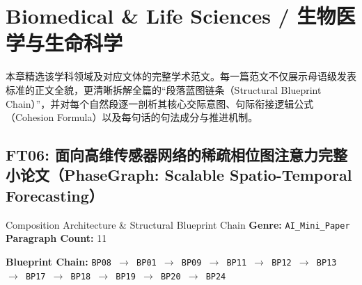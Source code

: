 \chapter{Biomedical \& Life Sciences / 生物医学与生命科学}\label{ch:anthology_19}
本章精选该学科领域及对应文体的完整学术范文。每一篇范文不仅展示母语级发表标准的正文全貌，更清晰拆解全篇的“段落蓝图链条（Structural Blueprint Chain）”，并对每个自然段逐一剖析其核心交际意图、句际衔接逻辑公式（Cohesion Formula）以及每句话的句法成分与推进机制。

\section{FT06: 面向高维传感器网络的稀疏相位图注意力完整小论文（PhaseGraph: Scalable Spatio-Temporal Forecasting）}\label{comp:FT06}
\begin{ConceptBox}{Composition Architecture \& Structural Blueprint Chain}
\textbf{Genre:} \texttt{AI\_Mini\_Paper} \quad \textbf{Paragraph Count:} 11\par
\textbf{Blueprint Chain:} \texttt{BP08 $\to$ BP01 $\to$ BP09 $\to$ BP11 $\to$ BP12 $\to$ BP13 $\to$ BP17 $\to$ BP18 $\to$ BP19 $\to$ BP20 $\to$ BP24}
\end{ConceptBox}
